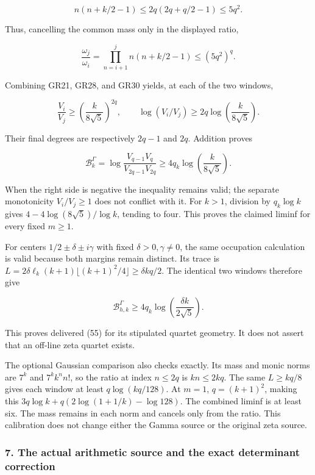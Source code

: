 \[
n(n+k/2-1)\le2q(2q+q/2-1)\le5q^2.
\tag{GR29}
\]

Thus, cancelling the common mass only in the displayed ratio,

\[
\frac{\omega_j}{\omega_i}
=\prod_{n=i+1}^{j}n(n+k/2-1)\le(5q^2)^q.
\tag{GR30}
\]

Combining GR21, GR28, and GR30 yields, at each of the two windows,

\[
\frac{V_i}{V_j}\ge\left(\frac{k}{8\sqrt5}\right)^{2q},
\qquad
\log(V_i/V_j)\ge2q\log\left(\frac{k}{8\sqrt5}\right).
\tag{GR31}
\]

Their final degrees are respectively \(2q-1\) and \(2q\). Addition proves

\[
\boxed{\mathcal B_k^\Gamma
=\log\frac{V_{q-1}V_q}{V_{2q-1}V_{2q}}
\ge4q_k\log\left(\frac{k}{8\sqrt5}\right).}
\tag{GR32}
\]

When the right side is negative the inequality remains valid; the separate monotonicity \(V_i/V_j\ge1\) does not conflict with it. For \(k>1\), division by \(q_k\log k\) gives \(4-4\log(8\sqrt5)/\log k\), tending to four. This proves the claimed liminf for every fixed \(m\ge1\).

For centers \(1/2\pm\delta\pm i\gamma\) with fixed \(\delta>0,\gamma\ne0\), the same occupation calculation is valid because both margins remain distinct. Its trace is \(L=2\delta\ell_k(k+1)\lfloor(k+1)^2/4\rfloor\ge\delta kq/2\). The identical two windows therefore give

\[
\mathcal B_{h,k}^{\Gamma}\ge4q_k\log\left(\frac{\delta k}{2\sqrt5}\right).
\tag{GR33}
\]

This proves delivered (55) for its stipulated quartet geometry. It does not assert that an off-line zeta quartet exists.

The optional Gaussian comparison also checks exactly. Its mass and monic norms are \(7^k\) and \(7^kk^nn!\), so the ratio at index \(n\le2q\) is \(kn\le2kq\). The same \(L\ge kq/8\) gives each window at least \(q\log(kq/128)\). At \(m=1\), \(q=(k+1)^2\), making this \(3q\log k+q(2\log(1+1/k)-\log128)\). The combined liminf is at least six. The mass remains in each norm and cancels only from the ratio. This calibration does not change either the Gamma source or the original zeta source.

\subsubsection{7. The actual arithmetic source and the exact determinant correction}\label{GraphV2:endpoint-gamma_review--the-actual-arithmetic-source-and-the-exact-determinant-correction}


